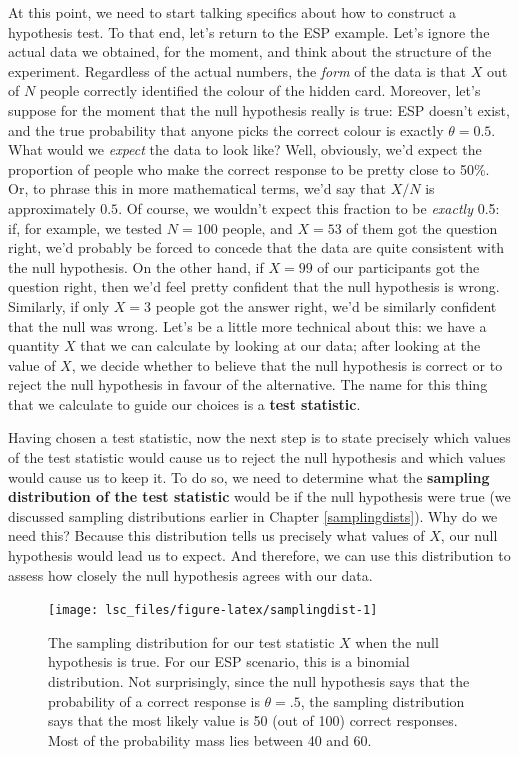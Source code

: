 \documentclass[
]{book}
\theoremstyle{definition}
\theoremstyle{definition}
\theoremstyle{definition}
\theoremstyle{definition}
\theoremstyle{remark}
\begin{document}
At this point, we need to start talking specifics about how to construct a hypothesis test. To that end, let's return to the ESP example. Let's ignore the actual data we obtained, for the moment, and think about the structure of the experiment. Regardless of the actual numbers, the \emph{form} of the data is that \(X\) out of \(N\) people correctly identified the colour of the hidden card. Moreover, let's suppose for the moment that the null hypothesis really is true: ESP doesn't exist, and the true probability that anyone picks the correct colour is exactly \(\theta = 0.5\). What would we \emph{expect} the data to look like? Well, obviously, we'd expect the proportion of people who make the correct response to be pretty close to 50\%. Or, to phrase this in more mathematical terms, we'd say that \(X/N\) is approximately \(0.5\). Of course, we wouldn't expect this fraction to be \emph{exactly} 0.5: if, for example, we tested \(N=100\) people, and \(X = 53\) of them got the question right, we'd probably be forced to concede that the data are quite consistent with the null hypothesis. On the other hand, if \(X = 99\) of our participants got the question right, then we'd feel pretty confident that the null hypothesis is wrong. Similarly, if only \(X=3\) people got the answer right, we'd be similarly confident that the null was wrong. Let's be a little more technical about this: we have a quantity \(X\) that we can calculate by looking at our data; after looking at the value of \(X\), we decide whether to believe that the null hypothesis is correct or to reject the null hypothesis in favour of the alternative. The name for this thing that we calculate to guide our choices is a \textbf{test statistic}.

Having chosen a test statistic, now the next step is to state precisely which values of the test statistic would cause us to reject the null hypothesis and which values would cause us to keep it. To do so, we need to determine what the \textbf{sampling distribution of the test statistic} would be if the null hypothesis were true (we discussed sampling distributions earlier in Chapter \ref{samplingdists}). Why do we need this? Because this distribution tells us precisely what values of \(X\), our null hypothesis would lead us to expect. And therefore, we can use this distribution to assess how closely the null hypothesis agrees with our data.

\begin{figure}

{\centering \texttt{[image: lsc\_files/figure-latex/samplingdist-1]} 

}

\caption{The sampling distribution for our test statistic $X$ when the null hypothesis is true. For our ESP scenario, this is a binomial distribution. Not surprisingly, since the null hypothesis says that the probability of a correct response is $\theta = .5$, the sampling distribution says that the most likely value is 50 (out of 100) correct responses. Most of the probability mass lies between 40 and 60.}\label{fig:samplingdist}
\end{figure}
\end{document}
